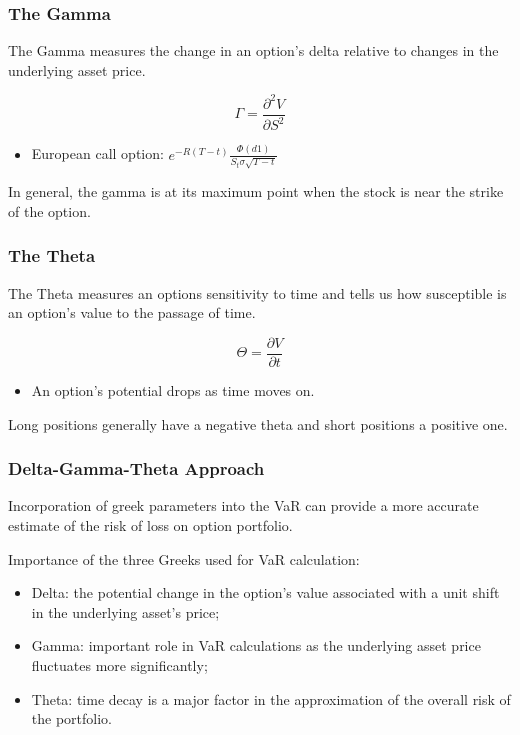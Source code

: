 \documentclass{beamer}
\begin{document}
\begin{frame}
    \frametitle{The Gamma}
    The Gamma measures the change in an option's 
    delta relative to changes in the underlying
    asset price.\pause

    \begin{block}{}
        $$
        \Gamma = \frac{\partial^2 V}{\partial S^2}
        $$
    \end{block}
    \pause
    \begin{itemize}
        \item European call option: $e^{-R(T-t)}\frac{\Phi(d1)}{S_t\sigma\sqrt{T-t}}$
    \end{itemize}
    \vspace{0.3cm}
    \pause 
    In general, the gamma is at its maximum point when the stock is near the 
    strike of the option.
\end{frame}

\begin{frame}
    \frametitle{The Theta}
    The Theta measures an options sensitivity to time 
    and tells us how susceptible is an option's value 
    to the passage of time.\pause

    \begin{block}{}
        $$
        \Theta = \frac{\partial V}{\partial t}
        $$  
    \end{block}\pause
    \vspace{0.3cm}
    \begin{itemize}
        \item An option's potential drops as time moves on. 
    \end{itemize}\pause
    \vspace{0.3cm}
    Long positions generally have a negative theta and 
    short positions a positive one.
    
\end{frame}

\begin{frame}
    \frametitle{Delta-Gamma-Theta Approach}
    Incorporation of greek parameters into the VaR can 
    provide a more accurate estimate of the risk of loss 
    on option portfolio.

    \vspace{0.3cm}
    \pause
    Importance of the three Greeks used for VaR calculation:
    \vspace{0.3cm}
    \pause
    \begin{itemize}
        \item Delta: the potential change 
        in the option's value associated with a 
        unit shift in the underlying asset's price;\pause
        \item Gamma: important role in 
        VaR calculations as the underlying asset price 
        fluctuates more significantly;\pause
        \item Theta: time decay is a major factor
        in the approximation of the overall risk of the portfolio.
    \end{itemize}
\end{frame}
\end{document}
